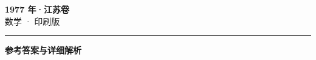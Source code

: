 \documentclass[zihao=5, a4paper]{ctexart}
\begin{document}
\begin{center}
  {\Large\bfseries 1977 年·江苏卷}\\[4pt]
  {\large 数学 · 印刷版}
\end{center}
\medskip
{}

\par\bigskip\hrule\bigskip
{}
\begin{center}{\large\bfseries 参考答案与详细解析}\end{center}
\smallskip

\end{document}
